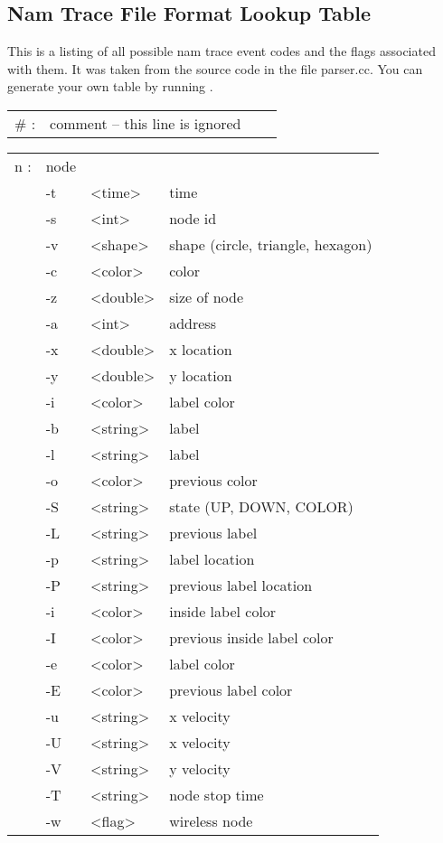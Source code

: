 \subsection{Nam Trace File Format Lookup Table}
This is a listing of all possible nam trace event codes and the flags associated with them.  It was taken from the source code in the file parser.cc.  You can generate your own table by running .

  \begin{tabular}{llll}
  \# : & comment -- this line is ignored & & \\
  \end{tabular}

  \begin{tabular}{llll}
  n : & node & & \\
    &  -t & <time> & time \\
    &  -s & <int> & node id \\
    &  -v & <shape> & shape (circle, triangle, hexagon) \\
    &  -c & <color> & color \\
    &  -z & <double> & size of node \\
    &  -a & <int> & address \\
    &  -x & <double> & x location \\
    &  -y & <double> & y location \\
    &  -i & <color> & label color \\
    &  -b & <string> & label \\
    &  -l & <string> & label \\
    &  -o & <color> & previous color \\
    &  -S & <string> & state (UP, DOWN, COLOR) \\
    &  -L & <string> & previous label \\
    &  -p & <string> & label location \\
    &  -P & <string> & previous label location \\
    &  -i & <color> & inside label color \\
    &  -I & <color> & previous inside label color \\
    &  -e & <color> & label color \\
    &  -E & <color> & previous label color \\
    &  -u & <string> & x velocity \\
    &  -U & <string> & x velocity \\
    &  -V & <string> & y velocity \\
    &  -T & <string> & node stop time \\
    &  -w & <flag> & wireless node \\
  \end{tabular}

